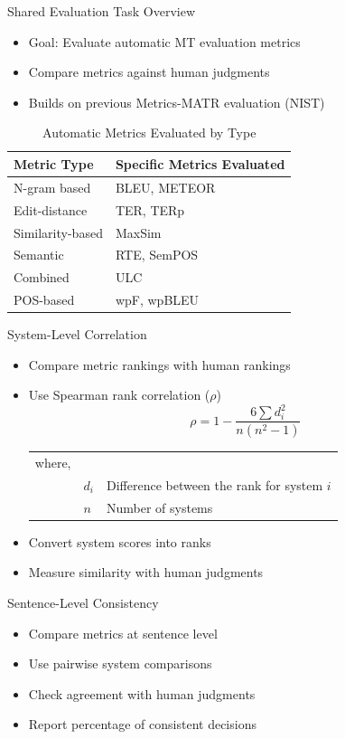 \begin{frame}{Shared Evaluation Task Overview}
\begin{itemize}
\item Goal: Evaluate automatic MT evaluation metrics
\item Compare metrics against human judgments
\item Builds on previous Metrics-MATR evaluation (NIST)
\end{itemize}
\begin{table}[ht]
\centering
\caption{Automatic Metrics Evaluated by Type}
\label{tab:automatic_metrics}
\begin{tabular}{ll}
\toprule
\textbf{Metric Type} & \textbf{Specific Metrics Evaluated} \\
\midrule
N-gram based & BLEU, METEOR \\
Edit-distance & TER, TERp \\
Similarity-based & MaxSim \\
Semantic & RTE, SemPOS \\
Combined & ULC \\
POS-based & wpF, wpBLEU \\
\bottomrule
\end{tabular}
\end{table}
\end{frame}

\begin{frame}{System-Level Correlation}
\begin{itemize}
\item Compare metric rankings with human rankings
\item Use Spearman rank correlation ($\rho$)
    \vspace{-0.5em}
        \begin{equation*}
            \rho = 1 - \frac{6 \sum d_{i}^2}{n (n^2 - 1)}
        \end{equation*}
    \vspace{-0.5em}
\begin{tabular}{lll}
    where, &&\\
    & $d_i$ & Difference between the rank for system $i$ \\
    & $n$ & Number of systems \\
\end{tabular}
\item Convert system scores into ranks
\item Measure similarity with human judgments
\end{itemize}
\end{frame}

\begin{frame}{Sentence-Level Consistency}
\begin{itemize}
\item Compare metrics at sentence level
\item Use pairwise system comparisons
\item Check agreement with human judgments
\item Report percentage of consistent decisions
\end{itemize}
\end{frame}
